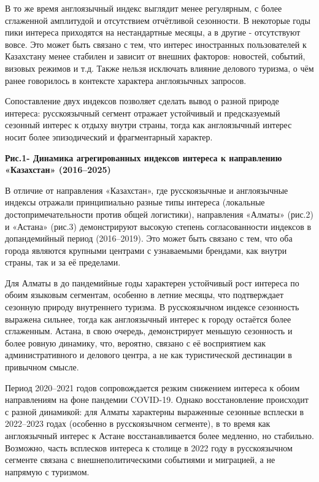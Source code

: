 В то же время англоязычный индекс выглядит менее регулярным, с более
сглаженной амплитудой и отсутствием отчётливой сезонности. В некоторые
годы пики интереса приходятся на нестандартные месяцы, а в другие -
отсутствуют вовсе. Это может быть связано с тем, что интерес иностранных
пользователей к Казахстану менее стабилен и зависит от внешних факторов:
новостей, событий, визовых режимов и т.д. Также нельзя исключать влияние
делового туризма, о чём ранее говорилось в контексте характера
англоязычных запросов.

Сопоставление двух индексов позволяет сделать вывод о разной природе
интереса: русскоязычный сегмент отражает устойчивый и предсказуемый
сезонный интерес к отдыху внутри страны, тогда как англоязычный интерес
носит более эпизодический и фрагментарный характер.

{\bfseries Рис.1- Динамика агрегированных индексов интереса к направлению
«Казахстан» (2016--2025)}

В отличие от направления «Казахстан», где русскоязычные и англоязычные
индексы отражали принципиально разные типы интереса (локальные
достопримечательности против общей логистики), направления «Алматы»
(рис.2) и «Астана» (рис.3) демонстрируют высокую степень
согласованности индексов в допандемийный период (2016--2019). Это может
быть связано с тем, что оба города являются крупными центрами с
узнаваемыми брендами, как внутри страны, так и за её пределами.

Для Алматы в до пандемийные годы характерен устойчивый рост интереса по
обоим языковым сегментам, особенно в летние месяцы, что подтверждает
сезонную природу внутреннего туризма. В русскоязычном индексе сезонность
выражена сильнее, тогда как англоязычный интерес к городу остаётся более
сглаженным. Астана, в свою очередь, демонстрирует меньшую сезонность и
более ровную динамику, что, вероятно, связано с её восприятием как
административного и делового центра, а не как туристической дестинации в
привычном смысле.

Период 2020--2021 годов сопровождается резким снижением интереса к обоим
направлениям на фоне пандемии COVID-19. Однако восстановление происходит
с разной динамикой: для Алматы характерны выраженные сезонные всплески в
2022--2023 годах (особенно в русскоязычном сегменте), в то время как
англоязычный интерес к Астане восстанавливается более медленно, но
стабильно. Возможно, часть всплесков интереса к столице в 2022 году в
русскоязычном сегменте связана с внешнеполитическими событиями и
миграцией, а не напрямую с туризмом.

